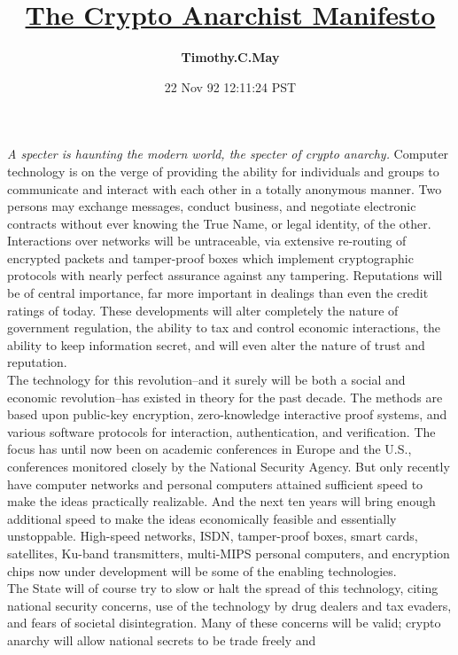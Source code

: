 \documentclass[12pt]{article}
\title{\textup{\Huge{\underline{The Crypto Anarchist Manifesto}}}}
\author{\textbf{\LARGE{Timothy.C.May}}}
\date{\textup{\Large{22 Nov 92 12:11:24 PST}}}
\begin{document}
\maketitle
\thispagestyle{empty}

\begin{flushleft}
\begin{justify} 
\textsl{A specter is haunting the modern world, the specter of crypto anarchy.}
Computer technology is on the verge of providing the ability for individuals
and groups to communicate and interact with each other in a totally anonymous
manner. Two persons may exchange messages, conduct business, and negotiate
electronic contracts without ever knowing the True Name, or legal identity, of
the other. Interactions over networks will be untraceable, via extensive
re-routing of encrypted packets and tamper-proof boxes which implement
cryptographic protocols with nearly perfect assurance against any tampering.
Reputations will be of central importance, far more important in dealings than
even the credit ratings of today. These developments will alter completely the
nature of government regulation, the ability to tax and control economic
interactions, the ability to keep information secret, and will even alter the
nature of trust and reputation.
\\
The technology for this revolution--and it surely will be both a social and
economic revolution--has existed in theory for the past decade. The methods are
based upon public-key encryption, zero-knowledge interactive proof systems, and
various software protocols for interaction, authentication, and verification.
The focus has until now been on academic conferences in Europe and the U.S.,
conferences monitored closely by the National Security Agency. But only
recently have computer networks and personal computers attained sufficient
speed to make the ideas practically realizable. And the next ten years will
bring enough additional speed to make the ideas economically feasible and
essentially unstoppable. High-speed networks, ISDN, tamper-proof boxes, smart
cards, satellites, Ku-band transmitters, multi-MIPS personal computers, and
encryption chips now under development will be some of the enabling
technologies.
\\
The State will of course try to slow or halt the spread of this technology,
citing national security concerns, use of the technology by drug dealers and
tax evaders, and fears of societal disintegration. Many of these concerns will
be valid; crypto anarchy will allow national secrets to be trade freely and

\end{justify}
\end{flushleft}
\end{document}

